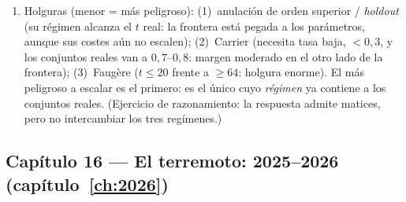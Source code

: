 \begin{enumerate}[leftmargin=1.9em,itemsep=4pt]
        frente lo que no pierde en el otro.
  \item Holguras (menor = más peligroso): (1)~anulación de orden
        superior / \emph{holdout} (su régimen alcanza el $t$ real:
        la frontera está pegada a los parámetros, aunque sus
        costes aún no escalen); (2)~Carrier (necesita tasa baja,
        $<0{,}3$, y los conjuntos reales van a $0{,}7$--$0{,}8$:
        margen moderado en el otro lado de la frontera);
        (3)~Faugère ($t\le20$ frente a $\ge64$: holgura enorme).
        El más peligroso a escalar es el primero: es el único
        cuyo \emph{régimen} ya contiene a los conjuntos reales.
        (Ejercicio de razonamiento: la respuesta admite matices,
        pero no intercambiar los tres regímenes.)
\end{enumerate}

\subsection*{Capítulo 16 --- El terremoto: 2025--2026
(capítulo~\ref{ch:2026})}

